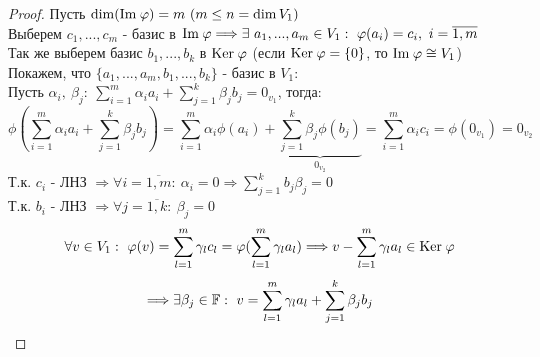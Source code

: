     \begin{proof}
        Пусть $\dim (\text{Im} \hspace{0.09cm} \phi) = m \ (m \leq n = \dim V_1 )$\\
        Выберем $c_1,...,c_m$ - базис в $\text{Im} \hspace{0.09cm} \phi \Longrightarrow \exists \ a_1,...,a_m \in V_1: \ \phi(a_i) = c_i, \ i = \overline{1,m}$\\
        Так же выберем базис $b_1,...,b_k$ в $\text{Ker} \hspace{0.09cm} \phi$ (если $\text{Ker} \hspace{0.09cm} \phi = \{0\}$, то $\text{Im} \hspace{0.09cm} \phi \cong V_1$)\\
        Покажем, что $\{a_1,...,a_m, b_1,...,b_k\}$  - базис в $V_1$:\\
        Пусть $\alpha_i, \ \beta_j : \ \sum \limits_{i=1}^m \alpha_i a_i + \sum \limits_{j=1}^k \beta_j b_j = 0_{v_1}$, тогда:
        $$\phi(\sum \limits_{i=1}^m \alpha_i a_i + \sum \limits_{j=1}^k \beta_j b_j) = \sum \limits_{i=1}^m \alpha_i \phi(a_i) + \underbrace{\sum \limits_{j=1}^k \beta_j \phi(b_j)}_{0_{v_2}}  = \sum \limits_{i=1}^m \alpha_i c_i = \phi(0_{v_1}) = 0_{v_2}$$
        Т.к. $c_i$ - ЛНЗ $\Longrightarrow \forall i = \overline{1,m}: \ \alpha_i = 0 \Longrightarrow \sum \limits_{j=1}^k b_j \beta_j = 0$\\
        Т.к. $b_i$ - ЛНЗ $\Longrightarrow \forall j= \overline{1,k}: \ \beta_j = 0$ 
        $$\forall v\in V_1: \ \phi(v) = \sum \limits_{l=1}^m \gamma_l c_l = \phi(\sum \limits_{l=1}^m \gamma_l a_l) \Longrightarrow v - \sum \limits_{l=1}^m \gamma_l a_l \in \text{Ker} \hspace{0.09cm} \phi$$
        $$\Longrightarrow \exists \beta_j \in \F : \ v = \sum \limits_{l=1}^m \gamma_l a_l + \sum \limits_{j=1}^k \beta_j b_j$$    
    \end{proof}